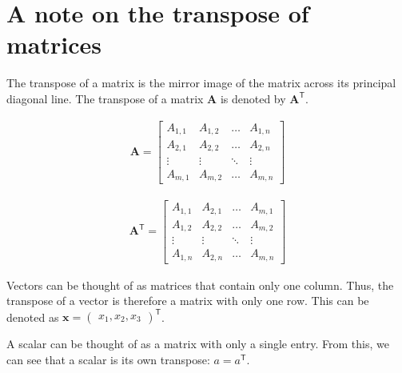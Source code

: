 \section{A note on the transpose of matrices}

The transpose of a matrix is the mirror image of the matrix across its principal diagonal line. The transpose of a matrix \(\mathbf{A}\) is denoted by \(\mathbf{A}^{\mathsf{T}}\).

\begin{align}
\mathbf{A} = \begin{bmatrix} 
A_{1,1} & A_{1,2} & \ldots & A_{1,n} \\ 
A_{2,1} & A_{2,2} & \ldots & A_{2,n} \\ 
\vdots & \vdots & \ddots & \vdots \\ 
A_{m,1} & A_{m,2} & \ldots & A_{m,n}
\end{bmatrix}
\end{align}

\begin{align}
\mathbf{A}^{\mathsf{T}} = \begin{bmatrix} 
A_{1,1} & A_{2,1} & \ldots & A_{m,1} \\ 
A_{1,2} & A_{2,2} & \ldots & A_{m,2} \\ 
\vdots & \vdots & \ddots & \vdots \\ 
A_{1,n} & A_{2,n} & \ldots & A_{m,n}
\end{bmatrix}
\end{align}

Vectors can be thought of as matrices that contain only one column. Thus, the transpose of a vector is therefore a matrix with only one row. This can be denoted as \(\mathbf{x} = \begin{pmatrix}x_{1},x_{2},x_{3}\end{pmatrix}^{\mathsf{T}}\).
\para

A scalar can be thought of as a matrix with only a single entry. From this, we can see that a scalar is its own transpose: \(a = a^{\mathsf{T}}\).

